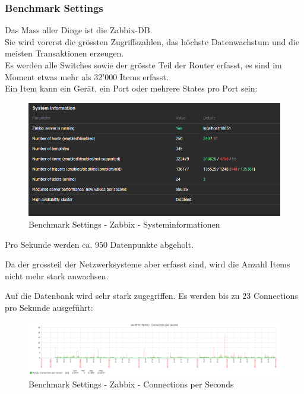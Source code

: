 
\begin{flushleft}
    \subsubsection{Benchmark Settings}
    Das Mass aller Dinge ist die Zabbix-DB.\\
    Sie wird vorerst die grössten Zugriffszahlen, das höchste Datenwachstum und die meisten Transaktionen erzeugen.\\
    Es werden alle Switches sowie der grösste Teil der Router erfasst, es sind im Moment etwas mehr als 32'000 Items erfasst.\\
    Ein Item kann ein Gerät, ein Port oder mehrere States pro Port sein:
    \begin{figure}[H]
        \centering
        \includegraphics[width=0.8\linewidth]{source/implementation/evaluation/benchmarking/sks0970_zabbix_system_information}
        \caption{Benchmark Settings - Zabbix - Systeminformationen}
        \label{fig:sks0970_zabbix_system_information}
    \end{figure}
    Pro Sekunde werden ca.
    950 Datenpunkte abgeholt.
\end{flushleft}
\begin{flushleft}
    Da der grossteil der Netzwerksysteme aber erfasst sind, wird die Anzahl Items nicht mehr stark anwachsen.
\end{flushleft}
\begin{flushleft}
    Auf die Datenbank wird sehr stark zugegriffen.
    Es werden bis zu 23 Connections pro Sekunde ausgeführt:
    \begin{figure}[H]
        \centering
        \includegraphics[width=0.8\linewidth]{source/implementation/evaluation/benchmarking/sks0970_zabbix_mariadb_connections_per_second_graph}
        \caption{Benchmark Settings - Zabbix - Connections per Seconds}
        \label{fig:sks0970_zabbix_mariadb_connections_per_second_graph}
    \end{figure}
\end{flushleft}
